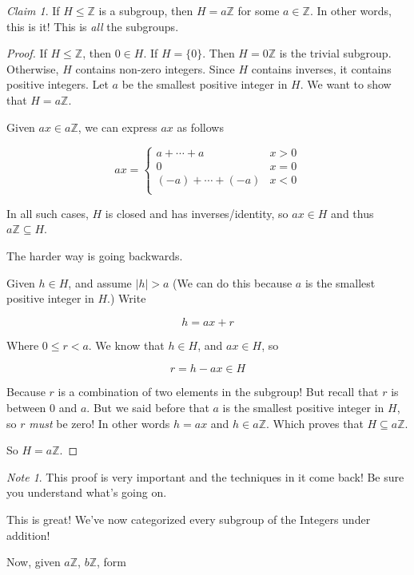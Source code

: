 \documentclass[12pt]{article}
\def\Z{{\mathbb Z}}
\theoremstyle{remark}
\theoremstyle{remark}
\newtheorem{claim}{Claim}
\theoremstyle{remark}
\theoremstyle{remark}
\theoremstyle{remark}
\newtheorem*{note}{Note}
\begin{document}
\begin{claim}
  If $H \le \Z$ is a subgroup, then $H = a\Z$ for some $a \in \Z$. In other words,
  this is it! This is {\it all} the subgroups.
\end{claim}

\begin{proof}
  If $H \le \Z$, then $0 \in H$. If $H = \{ 0 \}$. Then $H = 0\Z$ is the trivial
  subgroup. Otherwise, $H$ contains non-zero integers. Since $H$ contains
  inverses, it contains positive integers. Let $a$ be the smallest positive
  integer in $H$. We want to show that $H = a\Z$.

  Given $ax \in a\Z$, we can express $ax$ as follows

  \[
    ax = \begin{cases}
      a + \cdots + a       & x > 0 \\
      0                    & x = 0 \\
      (-a) + \cdots + (-a) & x < 0 \\
    \end{cases}
  \]

  In all such cases, $H$ is closed and has inverses/identity, so $ax \in H$ and
  thus $a\Z \subseteq H$.

  The harder way is going backwards.

  Given $h \in H$, and assume $|h| > a$ (We can do this because $a$ is the
  smallest positive integer in $H$.) Write

  \[
    h = ax + r
  \]

  Where $0 \le r < a$. We know that $h \in H$, and $ax \in H$, so

  \[
    r = h - ax \in H
  \]

  Because $r$ is a combination of two elements in the subgroup! But recall that
  $r$ is between $0$ and $a$. But we said before that $a$ is the smallest positive
  integer in $H$, so $r$ {\it must} be zero! In other words $h = ax$ and $h \in
    a\Z$. Which proves that $H \subseteq a\Z$.

  So $H = a\Z$.
\end{proof}

\begin{note}
	This proof is very important and the techniques in it come back! Be sure you
	understand what's going on.
\end{note}

This is great! We've now categorized every subgroup of the Integers under
addition!

Now, given $a\Z$, $b\Z$, form
\end{document}
